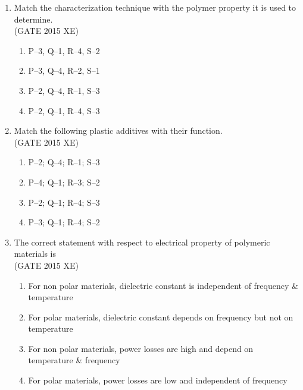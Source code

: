 \documentclass[journal,12pt,onecolumn]{IEEEtran}
\begin{document}
\begin{enumerate}
\newpage

\item Match the characterization technique with the polymer property it is used to determine.\\


\hfill{(GATE 2015 XE)} 
\begin{multicols}{4}
\begin{enumerate}
\item P–3, Q–1, R–4, S–2
\item P–3, Q–4, R–2, S–1
\item P–2, Q–4, R–1, S–3
\item P–2, Q–1, R–4, S–3
\end{enumerate}
\end{multicols}

\item Match the following plastic additives with their function.\\


\hfill{(GATE 2015 XE)} 
\begin{multicols}{2}
\begin{enumerate}
\item P–2; Q–4; R–1; S–3
\item P–4; Q–1; R–3; S–2
\item P–2; Q–1; R–4; S–3
\item P–3; Q–1; R–4; S–2
\end{enumerate}
\end{multicols}


\item The correct statement with respect to electrical property of polymeric materials is\\
\hfill{(GATE 2015 XE)} 
\begin{multicols}{2}
\begin{enumerate}
\item For non polar materials, dielectric constant is independent of frequency \& temperature\\
\item For polar materials, dielectric constant depends on frequency but not on temperature\\
\item For non polar materials, power losses are high and depend on temperature \& frequency\\
\item For polar materials, power losses are low and independent of frequency
\end{enumerate}
\end{multicols}



\end{enumerate}
\end{document}
